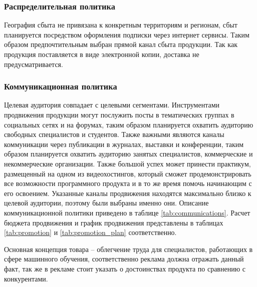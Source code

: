 \documentclass[../main]{subfiles}
\begin{document}
\subsubsection{Распределительная политика}
География сбыта не привязана к конкретным территориям и регионам, сбыт планируется посредством оформления подписки через интернет сервисы. Таким образом предпочтительным выбран прямой канал сбыта продукции. Так как продукция поставляется в виде электронной копии, доставка не предусматривается.

\subsubsection{Коммуникационная политика}
Целевая аудитория совпадает с целевыми сегментами. Инструментами продвижения продукции могут послужить посты в тематических группах в социальных сетях и на форумах, таким образом планируется охватить аудиторию свободных специалистов и студентов. Также важными являются каналы коммуникации через публикации в журналах, выставки и конференции, таким образом планируется охватить аудиторию занятых специалистов, коммерческие и некоммерческие организации. Также большой успех может принести практикум, размещенный на одном из видеохостингов, который сможет продемонстрировать все возможности программного продукта и в то же время помочь начинающим с его освоением. Указанные каналы продвижения находятся максимально близко к целевой аудитории, поэтому были выбраны именно они. Описание коммуникационной политики приведено в таблице \ref{tab:communications}. Расчет бюджета продвижения и график продвижения представлены в таблицах \ref{tab:promotion} и \ref{tab:promotion_plan} соответственно.

Основная концепция товара -- облегчение труда для специалистов, работающих в сфере машинного обучения, соответственно реклама должна отражать данный факт, так же в рекламе стоит указать о достоинствах продукта по сравнению с конкурентами. 
\end{document}
